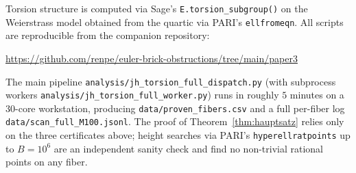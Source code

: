 \documentclass[12pt,a4paper,reqno]{amsart}
\theoremstyle{plain}
\theoremstyle{definition}
\theoremstyle{remark}
\begin{document}
Torsion structure is computed via Sage's \texttt{E.torsion\_subgroup()} on the Weierstrass model obtained from the quartic via PARI's \texttt{ellfromeqn}. All scripts are reproducible from the companion repository:

\begin{center}
\url{https://github.com/renpe/euler-brick-obstructions/tree/main/paper3}
\end{center}

The main pipeline \texttt{analysis/jh\_torsion\_full\_dispatch.py} (with subprocess workers \texttt{analysis/jh\_torsion\_full\_worker.py}) runs in roughly $5$ minutes on a $30$-core workstation, producing \texttt{data/proven\_fibers.csv} and a full per-fiber log \texttt{data/scan\_full\_M100.jsonl}. The proof of Theorem~\ref{thm:hauptsatz} relies only on the three certificates above; height searches via PARI's \texttt{hyperellratpoints} up to $B = 10^6$ are an independent sanity check and find no non-trivial rational points on any fiber.

\clearpage


\end{document}
